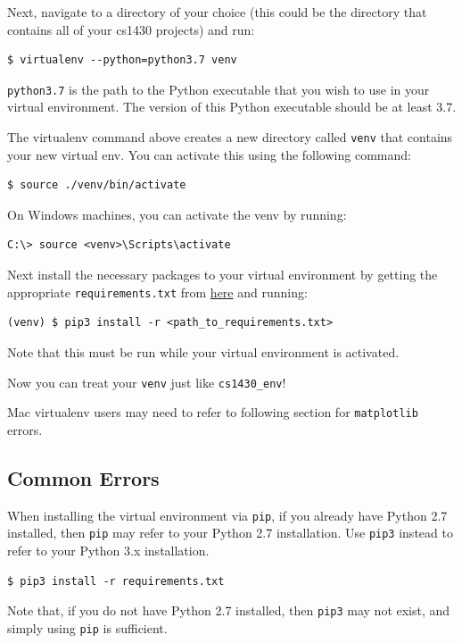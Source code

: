 \documentclass{article}
\begin{document}
Next, navigate to a directory of your choice (this could be the directory that contains all of your cs1430 projects) and run:
\begin{verbatim}
$ virtualenv --python=python3.7 venv
\end{verbatim}

\texttt{python3.7} is the path to the Python executable that you wish to use in your virtual environment. The version of this Python executable should be at least 3.7.

The virtualenv command above creates a new directory called \texttt{venv} that contains your new virtual env. You can activate this using the following command:
\begin{verbatim}
$ source ./venv/bin/activate
\end{verbatim}

On Windows machines, you can activate the venv by running:
\begin{verbatim}
C:\> source <venv>\Scripts\activate
\end{verbatim}

Next install the necessary packages to your virtual environment by getting the appropriate \texttt{requirements.txt} from  \href{http://cs.brown.edu/courses/csci1430/gradescope/requirements.txt}{here} and running:
\begin{verbatim}
(venv) $ pip3 install -r <path_to_requirements.txt>
\end{verbatim}

Note that this must be run while your virtual environment is activated.

Now you can treat your \texttt{venv} just like \texttt{cs1430\_env}!

Mac virtualenv users may need to refer to following section for \texttt{matplotlib} errors.

\subsection{Common Errors}
When installing the virtual environment via \texttt{pip}, if you already have Python 2.7 installed, then \texttt{pip} may refer to your Python 2.7 installation. Use \texttt{pip3} instead to refer to your Python 3.x installation.
\begin{verbatim}
$ pip3 install -r requirements.txt
\end{verbatim}
Note that, if you do not have Python 2.7 installed, then \texttt{pip3} may not exist, and simply using \texttt{pip} is sufficient.
\end{document}
